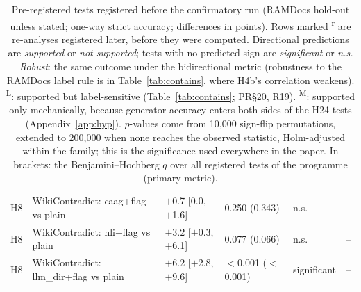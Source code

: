 \begin{table}[p]
{\begin{tabular}{lp{6.6cm}llll}
H8 & WikiContradict: caag+flag vs plain & $+$0.7 [0.0, $+$1.6] & 0.250 (0.343) & n.s. & -- \\
H8 & WikiContradict: nli+flag vs plain & $+$3.2 [$+$0.3, $+$6.1] & 0.077 (0.066) & n.s. & -- \\
H8 & WikiContradict: llm\_dir+flag vs plain & $+$6.2 [$+$2.8, $+$9.6] & $<$0.001 ($<$0.001) & significant & -- \\
\bottomrule
\end{tabular}}
\caption{Pre-registered tests registered before the confirmatory run (RAMDocs hold-out unless stated; one-way
strict accuracy; differences in points). Rows marked \textsuperscript{r} are re-analyses registered later, before
they were computed. Directional predictions are \emph{supported} or \emph{not supported}; tests with no predicted sign are \emph{significant} or \emph{n.s.} \emph{Robust}: the same outcome under the bidirectional metric (robustness to the RAMDocs label rule is in Table~\ref{tab:contains}, where H4b's correlation weakens). \textsuperscript{L}: supported but label-sensitive (Table~\ref{tab:contains}; PR\S20, R19). \textsuperscript{M}: supported only mechanically, because generator accuracy enters both sides of the H24 tests (Appendix~\ref{app:hyp}). $p$-values come from 10,000 sign-flip permutations, extended to 200,000 when none reaches the observed statistic, Holm-adjusted within the family; this is the significance used everywhere in the paper. In brackets: the Benjamini--Hochberg $q$ over all registered tests of the programme (primary metric).}
\label{tab:hypotheses}
\end{table}

